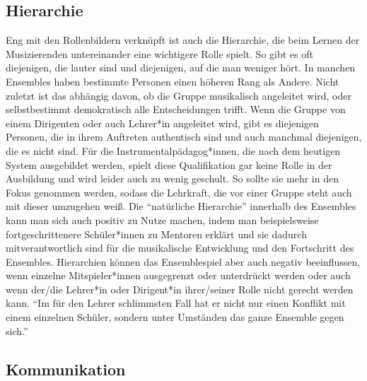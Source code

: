 \subsection{Hierarchie}

Eng mit den Rollenbildern verknüpft ist auch die Hierarchie, die beim Lernen der
Musizierenden untereinander eine wichtigere Rolle spielt. So gibt es oft
diejenigen, die lauter sind und diejenigen, auf die man weniger hört. In manchen
Ensembles haben bestimmte Personen einen höheren Rang als Andere. Nicht zuletzt
ist das abhängig davon, ob die Gruppe musikalisch angeleitet wird, oder
selbstbestimmt demokratisch alle Entscheidungen trifft. Wenn die Gruppe von
einem Dirigenten oder auch Lehrer*in angeleitet wird, gibt es diejenigen
Personen, die in ihrem Auftreten authentisch sind und auch manchmal diejenigen,
die es nicht sind. Für die Instrumentalpädagog*innen, die nach dem heutigen
System ausgebildet werden, spielt diese Qualifikation gar keine Rolle in der
Ausbildung und wird leider auch zu wenig geschult. So sollte sie mehr in den
Fokus genommen werden, sodass die Lehrkraft, die vor einer Gruppe steht auch mit dieser
umzugehen weiß. Die \enquote{natürliche Hierarchie} innerhalb des Ensembles kann
man sich auch positiv zu Nutze machen, indem man beispielsweise
fortgeschrittenere Schüler*innen zu Mentoren erklärt und sie dadurch
mitverantwortlich sind für die musikalische Entwicklung und den Fortschritt des
Ensembles.\autocite[95]{doerne:umfassend_musizieren} Hierarchien können das
Ensemblespiel aber auch negativ beeinflussen, wenn einzelne Mitspieler*innen
ausgegrenzt oder unterdrückt werden oder auch wenn der/die Lehrer*in oder
Dirigent*in ihrer/seiner Rolle nicht gerecht werden kann. \enquote{Im für den
Lehrer schlimmsten Fall hat er nicht nur einen Konflikt mit einem einzelnen
Schüler, sondern unter Umständen das ganze Ensemble gegen
sich.}\autocite[94]{mitzscherlich:musikpsychologie}



\subsection{Kommunikation}

